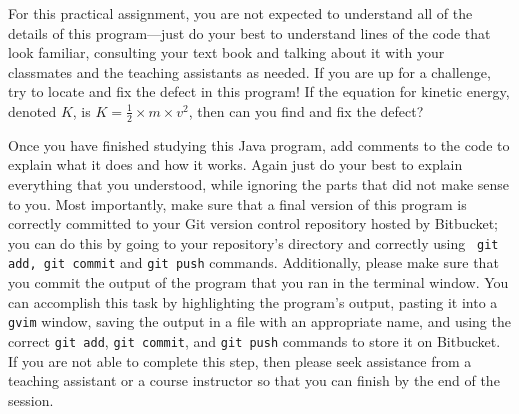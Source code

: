 For this practical assignment, you are not expected to understand all of the details of this program---just do your best
to understand lines of the code that look familiar, consulting your text book and talking about it with your classmates
and the teaching assistants as needed. If you are up for a challenge, try to locate and fix the defect in this program!
If the equation for kinetic energy, denoted $K$, is $K=\frac{1}{2} \times m \times v^2$, then can you find and fix the
defect?

Once you have finished studying this Java program, add comments to the code to explain what it does and how it works.
Again just do your best to explain everything that you understood, while ignoring the parts that did not make sense to
you.  Most importantly, make sure that a final version of this program is correctly committed to your Git version
control repository hosted by Bitbucket; you can do this by going to your repository's directory and correctly using {\tt
git add, git commit} and {\tt git push} commands. Additionally, please make sure that you commit the output of the
program that you ran in the terminal window.  You can accomplish this task by highlighting the program's output, pasting
it into a {\tt gvim} window, saving the output in a file with an appropriate name, and using the correct {\tt git add},
{\tt git commit}, and {\tt git push} commands to store it on Bitbucket.  If you are not able to complete this step,
then please seek assistance from a teaching assistant or a course instructor so that you can finish by the end of the
session.





    
